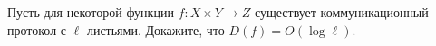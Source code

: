 Пусть для некоторой функции $f: X \times Y \to Z$ существует коммуникационный протокол с $\ell$
листьями. Докажите, что $D(f) = O(\log \ell)$.